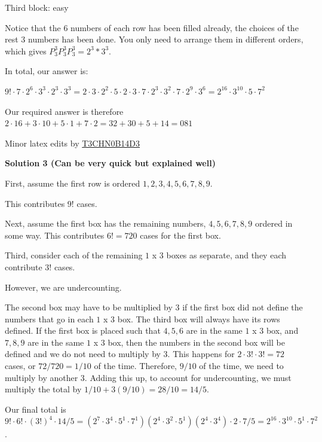 \begin{enumerate}
 Third block: easy

 Notice that the 6 numbers of each row has been filled already, the choices of the rest 3 numbers has been done. You only need to arrange them in different orders, which gives $P^3_3P^3_3P^3_3= 2^3 * 3^3$.

 In total, our answer is:

 $9! \cdot 7 \cdot 2^6 \cdot 3^3 \cdot 2^3 \cdot 3^3$$=2 \cdot 3 \cdot 2^2 \cdot 5 \cdot 2 \cdot 3 \cdot 7 \cdot 2^3 \cdot 3^2 \cdot 7 \cdot 2^9 \cdot 3^6$$=2^{16} \cdot 3^{10} \cdot 5 \cdot 7^2$

 Our required answer is therefore $2 \cdot 16 + 3 \cdot 10 + 5 \cdot 1 + 7 \cdot 2 = 32 + 30 + 5 + 14 = \boxed{081}$

 Minor latex edits by \href{https://artofproblemsolving.com/wiki/index.php?title=User:T3chn0b14d3&action=edit&redlink=1}{T3CHN0B14D3}

 



\textbf{Solution 3 (Can be very quick but explained well)}

First, assume the first row is ordered $1, 2, 3, 4, 5, 6, 7, 8, 9$. 

 This contributes $9!$ cases. 

 Next, assume the first box has the remaining numbers, $4, 5, 6, 7, 8, 9$ ordered in some way. This contributes $6! = 720$ cases for the first box.

 Third, consider each of the remaining $1$ x $3$ boxes as separate, and they each contribute $3!$ cases. 

 However, we are undercounting. 

 The second box may have to be multiplied by 3 if the first box did not define the numbers that go in each $1$ x $3$ box. The third box will always have its rows defined. If the first box is placed such that $4, 5, 6$ are in the same $1$ x $3$ box, and $7, 8, 9$ are in the same $1$ x $3$ box, then the numbers in the second box will be defined and we do not need to multiply by 3. This happens for $2 \cdot 3! \cdot 3! = 72$ cases, or $72 / 720 = 1 / 10$ of the time. Therefore, $9 / 10$ of the time, we need to multiply by another 3. Adding this up, to account for undercounting, we must multiply the total by $1 / 10 + 3(9 / 10) = 28 / 10 = 14 / 5$.

 Our final total is $9! \cdot 6! \cdot (3!)^4 \cdot 14 / 5 = (2^7 \cdot 3^4 \cdot 5^1 \cdot 7^1) (2^4 \cdot 3^2 \cdot 5^1) (2^4 \cdot 3^4) \cdot 2 \cdot 7 / 5 = 2^{16} \cdot 3^{10} \cdot 5^1 \cdot 7^2$. 


\end{enumerate}
